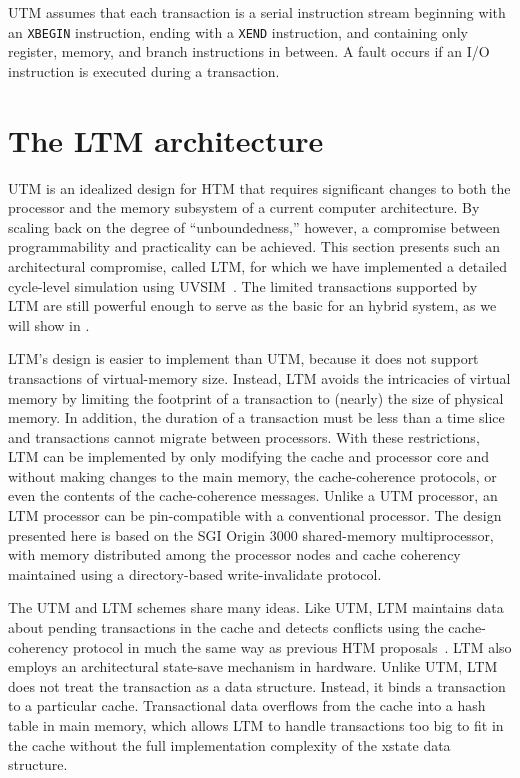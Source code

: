 UTM assumes that each transaction is a serial instruction stream
beginning with an \texttt{XBEGIN} instruction, ending with a
\texttt{XEND} instruction, and containing only register, memory, and
branch instructions in between.  A fault occurs if an I/O instruction
is executed during a transaction.

\section{The LTM architecture}\label{sec:ltm}

UTM is an idealized design for HTM that requires significant
changes to both the processor and the memory subsystem of a current
computer architecture.  By scaling back on the degree of
``unboundedness,'' however, a compromise between programmability and
practicality can be achieved.  This section presents such an
architectural compromise, called LTM, for which we have implemented
a detailed cycle-level simulation using UVSIM~\cite{Zhang03}.
The limited transactions supported by LTM are still powerful enough to
serve as the basic for an hybrid system, as we will show in
.

LTM's design is easier to implement than UTM, because it does
not support transactions of virtual-memory size.  Instead, LTM
avoids the intricacies of virtual memory by limiting the footprint of
a transaction to (nearly) the size of physical memory.  In addition,
the duration of a transaction must be less than a time slice and
transactions cannot migrate between processors.  With these
restrictions, LTM can be implemented by only modifying the cache
and processor core and without making changes to the main memory, the
cache-coherence protocols, or even the contents of the cache-coherence
messages.  Unlike a UTM processor, an LTM processor can be
pin-compatible with a conventional processor.  The design presented
here is based on the SGI Origin 3000 shared-memory multiprocessor,
with memory distributed among the processor nodes and cache coherency
maintained using a directory-based write-invalidate protocol.

The UTM and LTM schemes share many ideas.  Like UTM, LTM
maintains data about pending transactions in the cache and detects
conflicts using the cache-coherency protocol in much the same way as
previous HTM proposals~\cite{Knight86, HerlihyMo92}.  LTM also employs an
architectural state-save mechanism in hardware.  Unlike UTM, LTM
does not treat the transaction as a data structure.  Instead, it binds
a transaction to a particular cache.  Transactional data overflows
from the cache into a hash table in main memory, which allows LTM
to handle transactions too big to fit in the cache without the
full implementation complexity of the xstate data structure.

